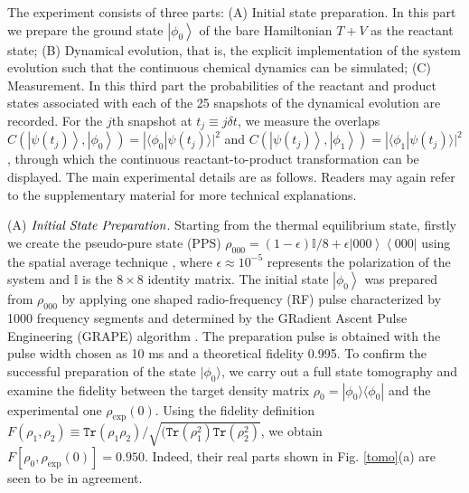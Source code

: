 \documentclass[prl,twocolumn,showpacs]{revtex4}
\newcommand{\la}{\langle}
\newcommand{\ra}{\rangle}
\begin{document}
The experiment consists of three parts: (A) Initial state preparation. In this part we prepare the ground state $\left\vert \phi_{0} \right\rangle$ of the bare Hamiltonian $T+V$ as the reactant state; (B) Dynamical evolution, that is, the explicit implementation of the system evolution such that the continuous chemical dynamics can be simulated; (C) Measurement. In this third part the probabilities of the reactant and product states associated with each of the 25 snapshots of the dynamical evolution are recorded.  For the $j$th snapshot at $t_j\equiv j\delta t$, we measure the overlaps $C(\left\vert \psi(t_j) \right\rangle,\left\vert \phi_{0} \right\rangle)=| \la\phi_0|\psi(t_j)\ra |^2$ and $C(\left\vert \psi(t_j) \right\rangle,\left\vert \phi_{1} \right\rangle)=
|\la\phi_1|\psi(t_j)\ra |^2$, through which the continuous reactant-to-product transformation can be displayed. The main experimental details are as follows. Readers may again refer to the supplementary material \cite{supplement} for more technical explanations.



(A) $\emph{Initial State Preparation}$. Starting from the thermal equilibrium state, firstly we create the pseudo-pure state (PPS) $\rho_{000}=(1-\epsilon)\mathbb{{I}}/8+\epsilon \left\vert 000 \right\rangle \left\langle000\right\vert$ using the spatial average technique \cite{spatial}, where $\epsilon \approx 10^{-5}$ represents the polarization of the system and ${\mathbb{{I}}}$ is the $8\times 8$ identity matrix.
The initial state $\left\vert \phi_{0} \right\rangle$ was prepared from $\rho_{000}$ by applying one shaped radio-frequency
(RF) pulse characterized by 1000 frequency
segments and determined by the GRadient Ascent Pulse Engineering (GRAPE) algorithm \cite{grape1,grape2,grape3}. The preparation pulse is obtained with the pulse width chosen as 10 ms and a theoretical fidelity 0.995.
To confirm the successful preparation of the state $\vert\phi_0\rangle$,   we carry out
 a full state tomography and examine the fidelity between the target density matrix $\rho_0=|\phi_0\rangle\langle\phi_0|$ and the experimental one $\rho_{\text{exp}}(0)$.  Using the
 fidelity definition $F(\rho_{1}, \rho_{2})\equiv \texttt{Tr}(\rho_1{\rho_2})/\sqrt{(\texttt{Tr}(\rho_1^2)\texttt{Tr}(\rho_2^2)}$,
 we obtain $F[\rho_0, \rho_{\text{exp}}(0)]=0.950$. Indeed, their real parts shown in Fig. \ref{tomo}(a) are seen to be in agreement.
\end{document}

